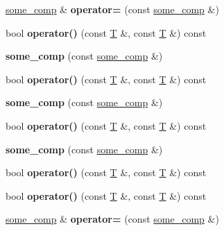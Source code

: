 \begin{DoxyCompactItemize}
\mbox{\hyperlink{structsome__comp}{some\+\_\+comp}} \& {\bfseries operator=} (const \mbox{\hyperlink{structsome__comp}{some\+\_\+comp}} \&)
\item 
\mbox{\label{structsome__comp_a6a7124af43ee189c025dee7d7482eaba}} 
bool {\bfseries operator()} (const \mbox{\hyperlink{struct_t}{T}} \&, const \mbox{\hyperlink{struct_t}{T}} \&) const
\item 
\mbox{\label{structsome__comp_acb6b551db492c34e1354464e12b57857}} 
{\bfseries some\+\_\+comp} (const \mbox{\hyperlink{structsome__comp}{some\+\_\+comp}} \&)
\item 
\mbox{\label{structsome__comp_a6a7124af43ee189c025dee7d7482eaba}} 
bool {\bfseries operator()} (const \mbox{\hyperlink{struct_t}{T}} \&, const \mbox{\hyperlink{struct_t}{T}} \&) const
\item 
\mbox{\label{structsome__comp_acb6b551db492c34e1354464e12b57857}} 
{\bfseries some\+\_\+comp} (const \mbox{\hyperlink{structsome__comp}{some\+\_\+comp}} \&)
\item 
\mbox{\label{structsome__comp_a6a7124af43ee189c025dee7d7482eaba}} 
bool {\bfseries operator()} (const \mbox{\hyperlink{struct_t}{T}} \&, const \mbox{\hyperlink{struct_t}{T}} \&) const
\item 
\mbox{\label{structsome__comp_acb6b551db492c34e1354464e12b57857}} 
{\bfseries some\+\_\+comp} (const \mbox{\hyperlink{structsome__comp}{some\+\_\+comp}} \&)
\item 
\mbox{\label{structsome__comp_a6a7124af43ee189c025dee7d7482eaba}} 
bool {\bfseries operator()} (const \mbox{\hyperlink{struct_t}{T}} \&, const \mbox{\hyperlink{struct_t}{T}} \&) const
\item 
\mbox{\label{structsome__comp_a6a7124af43ee189c025dee7d7482eaba}} 
bool {\bfseries operator()} (const \mbox{\hyperlink{struct_t}{T}} \&, const \mbox{\hyperlink{struct_t}{T}} \&) const
\item 
\mbox{\label{structsome__comp_a3cf31772d92b1481d71121d650f28a01}} 
\mbox{\hyperlink{structsome__comp}{some\+\_\+comp}} \& {\bfseries operator=} (const \mbox{\hyperlink{structsome__comp}{some\+\_\+comp}} \&)

\end{DoxyCompactItemize}
